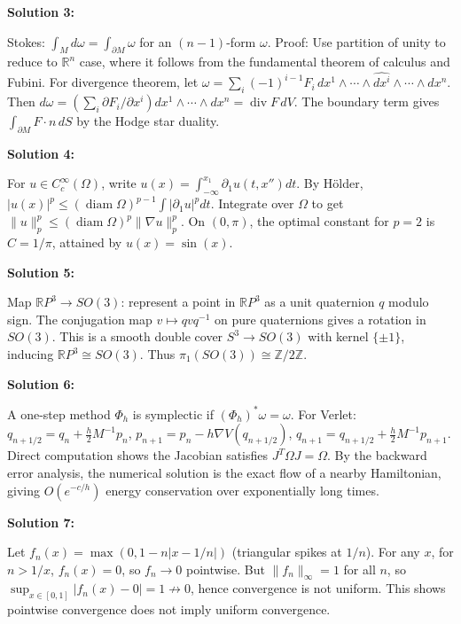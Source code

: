 \documentclass[12pt,a4paper]{exam}
\begin{document}
\textbf{Solution 3:}

Stokes: $\int_M d\omega = \int_{\partial M} \omega$ for an $(n-1)$-form $\omega$. Proof: Use partition of unity to reduce to $\mathbb{R}^n$ case, where it follows from the fundamental theorem of calculus and Fubini. For divergence theorem, let $\omega = \sum_i (-1)^{i-1} F_i \, dx^1 \wedge \cdots \wedge \widehat{dx^i} \wedge \cdots \wedge dx^n$. Then $d\omega = (\sum_i \partial F_i/\partial x^i) dx^1 \wedge \cdots \wedge dx^n = \operatorname{div} F \, dV$. The boundary term gives $\int_{\partial M} F \cdot n \, dS$ by the Hodge star duality.

\vspace{0.5cm}

\textbf{Solution 4:}

For $u \in C_c^\infty(\Omega)$, write $u(x) = \int_{-\infty}^{x_1} \partial_1 u(t, x'') dt$. By H\"older, $|u(x)|^p \leq (\operatorname{diam}\Omega)^{p-1} \int |\partial_1 u|^p dt$. Integrate over $\Omega$ to get $\|u\|_p^p \leq (\operatorname{diam}\Omega)^p \|\nabla u\|_p^p$. On $(0,\pi)$, the optimal constant for $p=2$ is $C = 1/\pi$, attained by $u(x) = \sin(x)$.

\vspace{0.5cm}

\textbf{Solution 5:}

Map $\mathbb{R}P^3 \to SO(3)$: represent a point in $\mathbb{R}P^3$ as a unit quaternion $q$ modulo sign. The conjugation map $v \mapsto q v q^{-1}$ on pure quaternions gives a rotation in $SO(3)$. This is a smooth double cover $S^3 \to SO(3)$ with kernel $\{\pm1\}$, inducing $\mathbb{R}P^3 \cong SO(3)$. Thus $\pi_1(SO(3)) \cong \mathbb{Z}/2\mathbb{Z}$.

\vspace{0.5cm}

\textbf{Solution 6:}

A one-step method $\Phi_h$ is symplectic if $(\Phi_h)^*\omega = \omega$. For Verlet: $q_{n+1/2} = q_n + \frac{h}{2} M^{-1} p_n$, $p_{n+1} = p_n - h \nabla V(q_{n+1/2})$, $q_{n+1} = q_{n+1/2} + \frac{h}{2} M^{-1} p_{n+1}$. Direct computation shows the Jacobian satisfies $J^T \Omega J = \Omega$. By the backward error analysis, the numerical solution is the exact flow of a nearby Hamiltonian, giving $O(e^{-c/h})$ energy conservation over exponentially long times.

\vspace{0.5cm}

\textbf{Solution 7:}

Let $f_n(x) = \max(0, 1 - n|x - 1/n|)$ (triangular spikes at $1/n$). For any $x$, for $n > 1/x$, $f_n(x) = 0$, so $f_n \to 0$ pointwise. But $\|f_n\|_\infty = 1$ for all $n$, so $\sup_{x \in [0,1]} |f_n(x) - 0| = 1 \not\to 0$, hence convergence is not uniform. This shows pointwise convergence does not imply uniform convergence.
\end{document}
